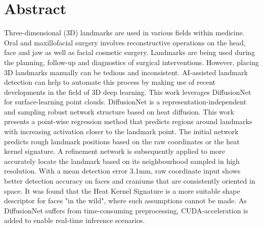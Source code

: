 \documentclass[class=article, crop=false]{standalone}
\begin{document}

\pagestyle{empty}


\section*{\centering Abstract}

Three-dimensional (3D) landmarks are used in various fields within medicine. Oral and maxillofacial surgery involves reconstructive operations on the head, face and jaw as well as facial cosmetic surgery. Landmarks are being used during the planning, follow-up and diagnostics of surgical interventions. However, placing 3D landmarks manually can be tedious and inconsistent. AI-assisted landmark detection can help to automate this process by making use of recent developments in the field of 3D deep learning.
This work leverages DiffusionNet for surface-learning point clouds. DiffusionNet is a representation-independent and sampling robust network structure based on heat diffusion.
This work presents a point-wise regression method that predicts regions around landmarks with increasing activation closer to the landmark point. The initial network predicts rough landmark positions based on the raw coordinates or the heat kernel signature. A refinement network is subsequently applied to more accurately locate the landmark based on its neighbourhood sampled in high resolution. With a mean detection error 3.1mm, raw coordinate input shows better detection accuracy on faces and craniums that are consistently oriented in space. It was found that the Heat Kernel Signature is a more suitable shape descriptor for faces "in the wild", where such assumptions cannot be made. As DiffusionNet suffers from time-consuming preprocessing, CUDA-acceleration is added to enable real-time inference scenarios.


\noindent
\clearpage
\end{document}
